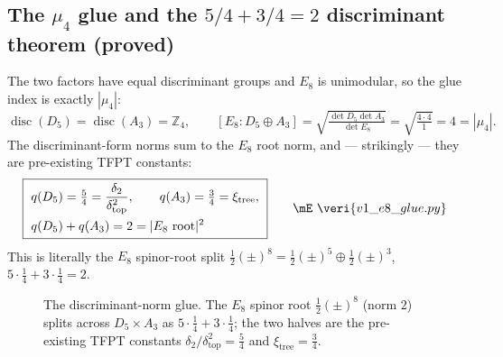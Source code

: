 \subsection{The $\mu_4$ glue and the $5/4+3/4=2$ discriminant theorem (proved)}
The two factors have equal discriminant groups and $E_8$ is unimodular, so the glue index is exactly
$|\mu_4|$:
\begin{equation}
  \operatorname{disc}(D_5)=\operatorname{disc}(A_3)=\mathbb Z_4,\qquad
  [E_8:D_5\oplus A_3]=\sqrt{\tfrac{\det D_5\det A_3}{\det E_8}}=\sqrt{\tfrac{4\cdot4}{1}}=4=|\mu_4| .
\end{equation}
The discriminant-form norms sum to the $E_8$ root norm, and --- strikingly --- they are pre-existing
TFPT constants:
\begin{equation}
  \boxed{\ \begin{aligned}
    &q(D_5)=\tfrac54=\frac{\dtwo}{\dtop^2},\qquad q(A_3)=\tfrac34=\xi_{\mathrm{tree}},\\
    &q(D_5)+q(A_3)=2=|\text{$E_8$ root}|^2
  \end{aligned}\ }\qquad\mE\ \veri{v1\_e8\_glue.py}
\end{equation}
This is literally the $E_8$ spinor-root split $\tfrac12(\pm)^8=\tfrac12(\pm)^5\oplus\tfrac12(\pm)^3$,
$5\cdot\tfrac14+3\cdot\tfrac14=2$.

\begin{figure}[ht]
\centering
{}
\caption{The discriminant-norm glue. The $E_8$ spinor root $\tfrac12(\pm)^8$ (norm $2$) splits across
$D_5\times A_3$ as $5\cdot\tfrac14+3\cdot\tfrac14$; the two halves are the pre-existing TFPT constants
$\delta_2/\delta_{\mathrm{top}}^2=\tfrac54$ and $\xi_{\mathrm{tree}}=\tfrac34$.}
\label{fig:gluenorm}
\end{figure}

